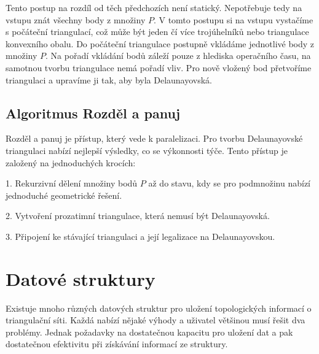 \documentclass[12pt,a4paper]{article}
\begin{document}
Tento postup na rozdíl od těch předchozích není statický. Nepotřebuje tedy na vstupu znát všechny body z množiny $P$. V tomto postupu si na vstupu vystačíme s počáteční triangulací, což může být jeden čí více trojúhelníků nebo triangulace konvexního obalu. Do počáteční triangulace postupně vkládáme jednotlivé body z množiny $P$. Na pořadí vkládání bodů záleží pouze z hlediska operačního času, na samotnou tvorbu triangulace nemá pořadí vliv. Pro nově vložený bod přetvoříme triangulaci a upravíme ji tak, aby byla Delaunayovská. 

\subsection{Algoritmus Rozděl a panuj}

Rozděl a panuj je přístup, který vede k paralelizaci. Pro tvorbu Delaunayovské triangulaci nabízí nejlepší výsledky, co se výkonnosti týče. Tento přístup je založený na jednoduchých krocích:

1. Rekurzivní dělení množiny bodů $P$ až do stavu, kdy se pro podmnožinu nabízí jednoduché geometrické řešení.

2. Vytvoření prozatimní triangulace, která nemusí být Delaunayovská.

3. Připojení ke stávající triangulaci a její legalizace na Delaunayovskou.


\newpage
\section{Datové struktury}

Existuje mnoho různých datových struktur pro uložení topologických informací o triangulační síti. Každá nabízí nějaké výhody a uživatel většinou musí řešit dva problémy. Jednak požadavky na dostatečnou kapacitu pro uložení dat a pak dostatečnou efektivitu při získávání informací ze struktury.

\end{document}
